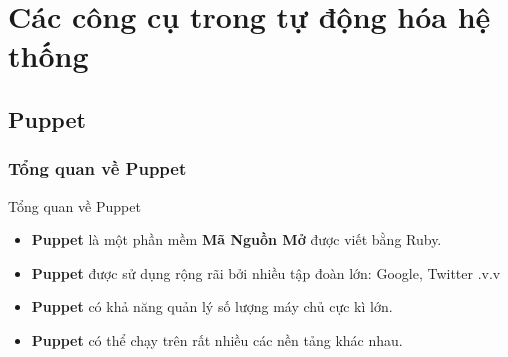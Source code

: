 \documentclass[14pt]{beamer}
\begin{document}
\section{Các công cụ trong tự động hóa hệ thống}
\subsection{Puppet}
\subsubsection*{Tổng quan về Puppet}
\begin{frame}{Tổng quan về Puppet}
  \begin{itemize}
    \item \textbf{Puppet} là một phần mềm \textbf{Mã Nguồn Mở} được viết bằng Ruby.
    \pause
    \item \textbf{Puppet} được sử dụng rộng rãi bởi nhiều tập đoàn lớn: Google, Twitter .v.v
    \pause
    \item \textbf{Puppet} có khả năng quản lý số lượng máy chủ cực kì lớn.
    \pause
    \item \textbf{Puppet} có thể chạy trên rất nhiều các nền tảng khác nhau.
  \end{itemize}
\end{frame}
\end{document}
